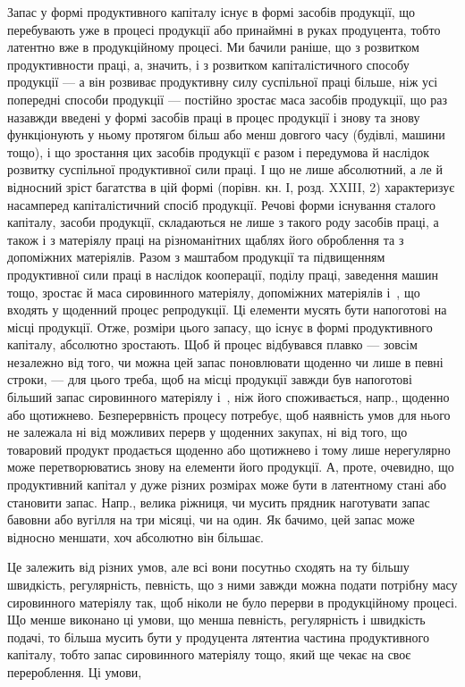 
Запас у формі продуктивного капіталу існує в формі засобів продукції,
що перебувають уже в процесі продукції або принаймні в руках
продуцента, тобто латентно вже в продукційному процесі. Ми бачили
раніше, що з розвитком продуктивности праці, а, значить, і з розвитком
капіталістичного способу продукції — а він розвиває продуктивну
силу суспільної праці більше, ніж усі попередні способи продукції —
постійно зростає маса засобів продукції, що раз назавжди введені
у формі засобів праці в процес продукції і знову та знову
функціонують у ньому протягом більш або менш довгого часу (будівлі,
машини тощо), і що зростання цих засобів продукції є разом і передумова
й наслідок розвитку суспільної продуктивної сили праці. І що не
лише абсолютний, а ле й відносний зріст багатства в цій формі (порівн.
кн. І, розд. XXIII, 2) характеризує насамперед капіталістичний спосіб
продукції. Речові форми існування сталого капіталу, засоби продукції,
складаються не лише з такого роду засобів праці, а також і з матеріялу
праці на різноманітних щаблях його оброблення та з допоміжних матеріялів.
Разом з маштабом продукції та підвищенням продуктивної сили
праці в наслідок кооперації, поділу праці, заведення машин тощо, зростає
й маса сировинного матеріялу, допоміжних матеріялів і~, що
входять у щоденний процес репродукції. Ці елементи мусять бути напоготові
на місці продукції. Отже, розміри цього запасу, що існує в формі продуктивного
капіталу, абсолютно зростають. Щоб й процес відбувався плавко —
зовсім незалежно від того, чи можна цей запас поновлювати щоденно чи
лише в певні строки, — для цього треба, щоб на місці продукції завжди
був напоготові більший запас сировинного матеріялу і~, ніж його
споживається, напр., щоденно або щотижнево. Безперервність процесу
потребує, щоб наявність умов для нього не залежала ні від можливих
перерв у щоденних закупах, ні від того, що товаровий продукт продається
щоденно або щотижнево і тому лише нерегулярно може перетворюватись
знову на елементи його продукції. А, проте, очевидно, що
продуктивний капітал у дуже різних розмірах може бути в латентному
стані або становити запас. Напр., велика ріжниця, чи мусить прядник
наготувати запас бавовни або вугілля на три місяці, чи на один. Як
бачимо, цей запас може відносно меншати, хоч абсолютно він більшає.

Це залежить від різних умов, але всі вони посутньо сходять на ту
більшу швидкість, регулярність, певність, що з ними завжди можна подати
потрібну масу сировинного матеріялу так, щоб ніколи не було перерви
в продукційному процесі. Що менше виконано ці умови, що менша
певність, регулярність і швидкість подачі, то більша мусить бути у продуцента
лятентиа частина продуктивного капіталу, тобто запас сировинного
матеріялу тощо, який ще чекає на своє перероблення. Ці умови,
\parbreak{}  %
